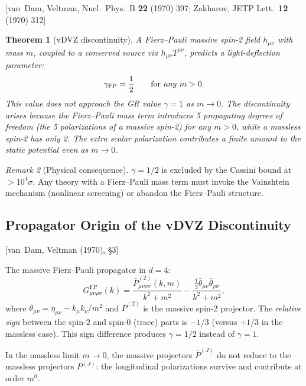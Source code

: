 \documentclass[11pt,a4paper]{article}
\theoremstyle{plain}
\newtheorem{theorem}{Theorem}[section]
\theoremstyle{definition}
\theoremstyle{remark}
\newtheorem{remark}[theorem]{Remark}
\newcommand{\fromlit}[1]{\textcolor{sctblue}{\textsf{[#1]}}}
\begin{document}
\fromlit{van~Dam, Veltman, Nucl.\ Phys.\ B \textbf{22} (1970) 397;
Zakharov, JETP Lett.\ \textbf{12} (1970) 312}

\begin{theorem}[vDVZ discontinuity]\label{thm:vdvz}
A Fierz--Pauli massive spin-2 field $h_{\mu\nu}$ with mass $m$,
coupled to a conserved source via $h_{\mu\nu}T^{\mu\nu}$,
predicts a light-deflection parameter:
\begin{equation}\label{eq:vdvz-gamma}
  \gamma_{\mathrm{FP}} = \frac{1}{2}
  \qquad\text{for \emph{any} } m > 0.
\end{equation}
This value does \emph{not} approach the GR value $\gamma = 1$
as $m \to 0$.  The discontinuity arises because the Fierz--Pauli
mass term introduces 5 propagating degrees of freedom (the 5
polarizations of a massive spin-2) for any $m > 0$, while a
massless spin-2 has only 2.  The extra scalar polarization
contributes a finite amount to the static potential even as
$m \to 0$.
\end{theorem}

\begin{remark}[Physical consequence]
$\gamma = 1/2$ is excluded by the Cassini bound at
$> 10^4\sigma$.  Any theory with a Fierz--Pauli mass term
must invoke the Vainshtein mechanism (nonlinear screening)
or abandon the Fierz--Pauli structure.
\end{remark}

\subsection{Propagator Origin of the vDVZ Discontinuity}

\fromlit{van~Dam, Veltman (1970), \S3}

The massive Fierz--Pauli propagator in $d = 4$:
\begin{equation}\label{eq:FP-prop}
  G_{\mu\nu\rho\sigma}^{\mathrm{FP}}(k)
  = \frac{\bar{P}^{(2)}_{\mu\nu\rho\sigma}(k,m)}{k^2 + m^2}
  - \frac{\frac{1}{3}\bar{\theta}_{\mu\nu}\bar{\theta}_{\rho\sigma}}
         {k^2 + m^2},
\end{equation}
where $\bar{\theta}_{\mu\nu} = \eta_{\mu\nu} - k_\mu k_\nu/m^2$
and $\bar{P}^{(2)}$ is the massive spin-2 projector.  The
\emph{relative sign} between the spin-2 and spin-0 (trace) parts
is $-1/3$ (versus $+1/3$ in the massless case).  This sign
difference produces $\gamma = 1/2$ instead of $\gamma = 1$.

In the massless limit $m \to 0$, the massive projectors
$\bar{P}^{(J)}$ do not reduce to the massless projectors $P^{(J)}$:
the longitudinal polarizations survive and contribute at order $m^0$.
\end{document}
